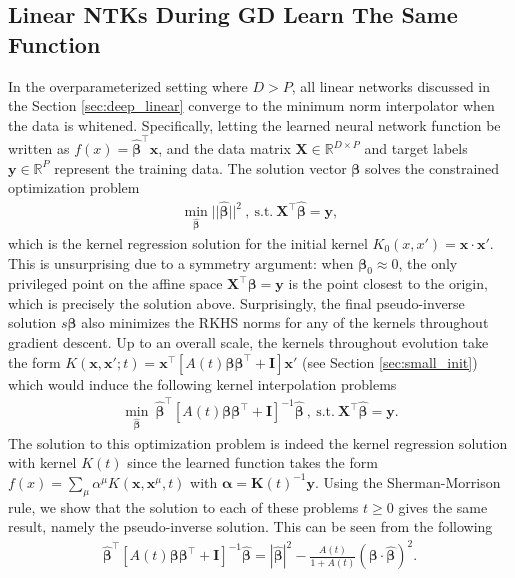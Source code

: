 \documentclass{article} %
\def\x{\bm x}
\begin{document}
\begin{appendix}
\section{Linear NTKs During GD Learn The Same Function}\label{app:all_ntk_learn_same}
In the overparameterized setting where $D > P$, all linear networks discussed in the Section \ref{sec:deep_linear} converge to the minimum norm interpolator when the data is whitened. Specifically, letting the learned neural network function be written as $f(x) = \bm{\hat\beta}^\top \x$, and the data matrix $\bm X \in \mathbb{R}^{D \times P}$ and target labels $\bm y\in\mathbb{R}^{P}$ represent the training data. The solution vector $\bm\beta$ solves the constrained optimization problem
\begin{align}
    \min_{\bm{\hat\beta}} ||\bm{\hat\beta}||^2 \ , \ \text{s.t.} \ \bm X^\top \bm{\hat\beta} = \bm y,
\end{align}
which is the kernel regression solution for the initial kernel $K_0(x,x') = \x \cdot \x'$. This is unsurprising due to a symmetry argument: when $\bm\beta_0 \approx 0$, the only privileged point on the affine space $\bm X^\top \bm \beta = \bm y$ is the point closest to the origin, which is precisely the solution above. Surprisingly, the final pseudo-inverse solution $s \bm\beta$ also minimizes the RKHS norms for any of the kernels throughout gradient descent. Up to an overall scale, the kernels throughout evolution take the form $K(\x,\x';t) = \bm x^\top \left[ A(t) \bm\beta \bm\beta^\top + \bm I \right] \bm x'$ (see Section \ref{sec:small_init}) which would induce the following kernel interpolation problems 
\begin{align}
    \min_{\bm{\hat \beta}} \ \bm{\hat \beta}^\top \left[ A(t) \bm\beta \bm\beta^\top + \bm I \right]^{-1} \bm{\hat \beta} \ , \ \text{s.t.} \ \bm X^\top \bm{\hat\beta} = \bm y.
\end{align}
The solution to this optimization problem is indeed the kernel regression solution with kernel $K(t)$ since the learned function takes the form $f(x) = \sum_{\mu} \alpha^\mu K(\x,\x^\mu,t)$ with $\bm\alpha = \bm K(t)^{-1} \bm y$. Using the Sherman-Morrison rule, we show that the solution to each of these problems $t \geq 0$ gives the same result, namely the pseudo-inverse solution. This can be seen from the following
\begin{align}
    \bm{\hat \beta}^\top \left[ A(t) \bm\beta \bm\beta^\top + \bm I \right]^{-1} \bm{\hat \beta} = |\bm{\hat \beta}|^2- \frac{A(t)}{1+A(t)} \left( \bm\beta \cdot \bm{\hat \beta} \right)^2.
\end{align}


\end{appendix}
\end{document}
